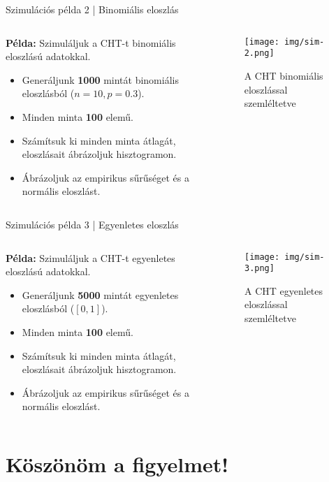 \documentclass[aspectratio=169,12pt]{beamer}
\begin{document}
	\begin{frame}{Szimulációs példa 2 | Binomiális eloszlás}
		\begin{columns}
			\begin{column}{0.5\textwidth}
				\textbf{Példa:} Szimuláljuk a CHT-t binomiális eloszlású adatokkal.
				\begin{itemize}
					\item Generáljunk \textbf{1000} mintát binomiális eloszlásból (\(n=10, p=0.3\)).
					\item Minden minta \textbf{100} elemű.
					\item Számítsuk ki minden minta átlagát, eloszlásait ábrázoljuk hisztogramon.
					\item Ábrázoljuk az empirikus sűrűséget és a normális eloszlást.
				\end{itemize}
			\end{column}
			\begin{column}{0.5\textwidth}
				\begin{figure}
					\texttt{[image: img/sim-2.png]}
					\caption{A CHT binomiális eloszlással szemléltetve}
				\end{figure}
			\end{column}
		\end{columns}
	\end{frame}
	
	\begin{frame}{Szimulációs példa 3 | Egyenletes eloszlás}
		\begin{columns}
			\begin{column}{0.5\textwidth}
				\textbf{Példa:} Szimuláljuk a CHT-t egyenletes eloszlású adatokkal.
				\begin{itemize}
					\item Generáljunk \textbf{5000} mintát egyenletes eloszlásból (\([0,1]\)).
					\item Minden minta \textbf{100} elemű.
					\item Számítsuk ki minden minta átlagát, eloszlásait ábrázoljuk hisztogramon.
					\item Ábrázoljuk az empirikus sűrűséget és a normális eloszlást.
				\end{itemize}
			\end{column}
			\begin{column}{0.5\textwidth}
				\begin{figure}
					\texttt{[image: img/sim-3.png]}
					\caption{A CHT egyenletes eloszlással szemléltetve}
				\end{figure}
			\end{column}
		\end{columns}
	\end{frame}
	
	
	\section{Köszönöm a figyelmet!}

	
\end{document}
